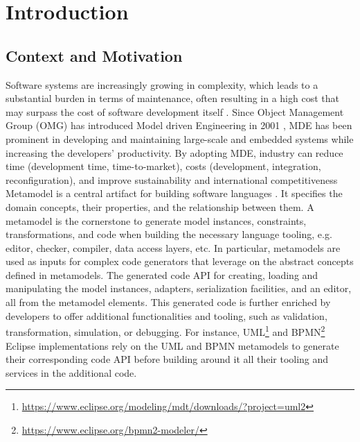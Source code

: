 \chapter*{Introduction}



\section*{Context and Motivation}
Software systems are increasingly growing in complexity, which leads to a substantial burden in terms of maintenance, often resulting in a high cost that may surpass the cost of software development itself \cite{https://doi.org/10.1049/sfw2.12075}.
Since Object Management Group (OMG) has introduced Model driven Engineering in 2001 \cite{brambilla2017model}, MDE has been prominent in developing and maintaining large-scale and embedded systems while increasing the developers' productivity. By adopting MDE, industry can reduce time (development time, time-to-market), costs (development, integration, reconfiguration), and improve sustainability and international competitiveness %
Metamodel is a central artifact for building software languages \cite{cabot2012object}. It specifies the domain concepts, their properties, and the relationship between them.
A metamodel is the cornerstone to generate model instances, constraints, transformations, and code when building the necessary language tooling, e.g. editor, checker, compiler, data access layers, etc. 
In particular, metamodels are used as inputs for complex code generators that leverage on the abstract concepts defined in metamodels. The generated code API for creating, loading and manipulating the model instances, adapters, serialization facilities, and an editor, all from the metamodel elements.
This generated code is further enriched by developers to offer additional functionalities and tooling, such as validation, transformation, simulation, or debugging.
For instance, UML\footnote{\url{https://www.eclipse.org/modeling/mdt/downloads/?project=uml2}}  and BPMN\footnote{\url{https://www.eclipse.org/bpmn2-modeler/}} Eclipse implementations rely on the UML and BPMN metamodels to generate their corresponding code API before building around it all their tooling and services in the additional code.
